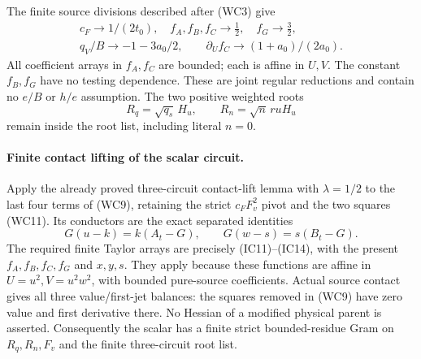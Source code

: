 The finite source divisions described after (WC3) give
\[
 \begin{gathered}
 c_F\to1/(2t_0),\quad f_A,f_B,f_C\to\tfrac12,
 \quad f_G\to\tfrac32,\\
 q_V/B\to-1-3a_0/2,\qquad
 \partial_U f_C\to(1+a_0)/(2a_0).                  
 \end{gathered} \tag{WC10}
\]
All coefficient arrays in $f_A,f_C$ are bounded; each is affine
in $U,V$. The constant $f_B,f_G$ have no testing dependence.
These are joint regular reductions and contain no $e/B$ or $h/e$
assumption. The two positive weighted roots
\[
 R_q=\sqrt{q_s}\,H_u,\qquad R_n=\sqrt n\,r uH_u            \tag{WC11}
\]
remain inside the root list, including literal $n=0$.

\paragraph{Finite contact lifting of the scalar circuit.}
Apply the already proved three-circuit contact-lift lemma with
$\lambda=1/2$ to the last four terms of (WC9), retaining the strict
$c_FF_v^2$ pivot and the two squares (WC11). Its conductors are
the exact separated identities
\[
 G(u-k)=k(A_t-G),\qquad G(w-s)=s(B_t-G).                \tag{WC12}
\]
The required finite Taylor arrays are precisely (IC11)--(IC14),
with the present $f_A,f_B,f_C,f_G$ and $x,y,s$. They apply because
these functions are affine in $U=u^2,V=u^2w^2$, with bounded
pure-source coefficients. Actual source contact gives all three
value/first-jet balances: the squares removed in (WC9) have zero
value and first derivative there. No Hessian of a modified physical
parent is asserted. Consequently the scalar has a finite strict
bounded-residue Gram on $R_q,R_n,F_v$ and the finite three-circuit
root list.


